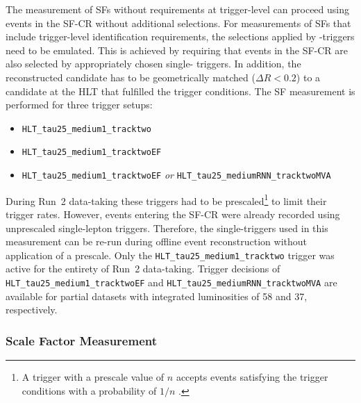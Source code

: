 The measurement of SFs without requirements at trigger-level can proceed using
events in the SF-CR without additional selections. For measurements of SFs that
include trigger-level identification requirements, the selections applied by
\tauhadvis-triggers need to be emulated. This is achieved by requiring that
events in the SF-CR are also selected by appropriately chosen single-\tauhadvis
triggers. In addition, the reconstructed \tauhadvis candidate has to be
geometrically matched ($\Delta R < 0.2$) to a \tauhadvis candidate at the HLT
that fulfilled the trigger conditions. The SF measurement is performed for three
trigger setups:
\begin{itemize}
\item \verb|HLT_tau25_medium1_tracktwo| %
\item \verb|HLT_tau25_medium1_tracktwoEF| %
\item \verb|HLT_tau25_medium1_tracktwoEF| \emph{or}
  \verb|HLT_tau25_mediumRNN_tracktwoMVA| %
\end{itemize}
During Run~2 data-taking these triggers had to be prescaled\footnote{A trigger
  with a prescale value of $n$ accepts events satisfying the trigger conditions
  with a probability of $1 / n$ \cite{TRIG-2019-04}.} to limit their trigger
rates. However, events entering the SF-CR were already recorded using
unprescaled single-lepton triggers. Therefore, the single-\tauhadvis triggers
used in this measurement can be re-run during offline event reconstruction
without application of a prescale.
Only the \verb|HLT_tau25_medium1_tracktwo| trigger
was active for the entirety of Run~2 data-taking. Trigger decisions of
\verb|HLT_tau25_medium1_tracktwoEF| and \verb|HLT_tau25_mediumRNN_tracktwoMVA|
are available for partial datasets with integrated luminosities of \SI{58}{\ifb}
  and \SI{37}{\ifb}, respectively.


\subsubsection{Scale Factor Measurement}

